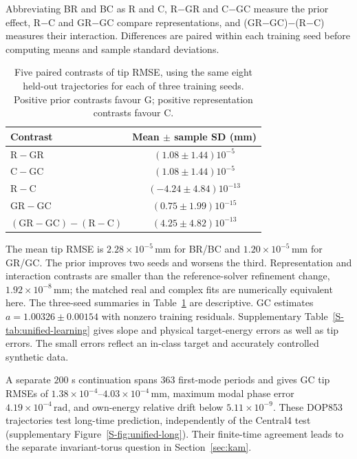 Abbreviating BR and BC as R and C, R$-$GR and C$-$GC measure the prior
effect, R$-$C and GR$-$GC compare representations, and
(GR$-$GC)$-$(R$-$C) measures their interaction. Differences are paired
within each training seed before computing means and sample standard
deviations.

\begin{table}[t]
\centering
\caption{Five paired contrasts of tip RMSE, using the same eight held-out
trajectories for each of three training seeds. Positive prior contrasts
favour G; positive representation contrasts favour C.}
\label{tab:core-learning}
\setlength{\tabcolsep}{3.5pt}
\begin{tabular}{lc}
\toprule
Contrast & Mean $\pm$ sample SD (mm)\\
\midrule
$\mathrm R-\mathrm{GR}$ & $(1.08\!\pm\!1.44)10^{-5}$\\
$\mathrm C-\mathrm{GC}$ & $(1.08\!\pm\!1.44)10^{-5}$\\
$\mathrm R-\mathrm C$ & $(-4.24\!\pm\!4.84)10^{-13}$\\
$\mathrm{GR}-\mathrm{GC}$ & $(0.75\!\pm\!1.99)10^{-15}$\\
$(\mathrm{GR}-\mathrm{GC})-(\mathrm R-\mathrm C)$ & $(4.25\!\pm\!4.82)10^{-13}$\\
\bottomrule
\end{tabular}
\end{table}

The mean tip RMSE is $2.28\times10^{-5}\,\mathrm{mm}$ for BR/BC and
$1.20\times10^{-5}\,\mathrm{mm}$ for GR/GC. The prior improves two seeds
and worsens the third. Representation and interaction contrasts are
smaller than the reference-solver refinement change,
$1.92\times10^{-8}\,\mathrm{mm}$; the matched real and complex fits
are numerically equivalent here. The three-seed summaries in
Table~\ref{tab:core-learning} are descriptive.
GC estimates $a=1.00326\pm0.00154$ with nonzero training residuals.
Supplementary Table~\ref{S-tab:unified-learning} gives slope and physical
target-energy errors as well as tip errors. The small errors reflect
an in-class target and accurately controlled synthetic data.

A separate $200$ s continuation spans $363$ first-mode periods and gives
GC tip RMSEs of $1.38\times10^{-4}$--$4.03\times10^{-4}\,\mathrm{mm}$,
maximum modal phase error $4.19\times10^{-4}\,\mathrm{rad}$, and
own-energy relative drift below $5.11\times10^{-9}$.
These DOP853 trajectories test long-time prediction, independently of
the Central4 test (supplementary Figure~\ref{S-fig:unified-long}).
Their finite-time agreement leads to the separate invariant-torus
question in Section~\ref{sec:kam}.

